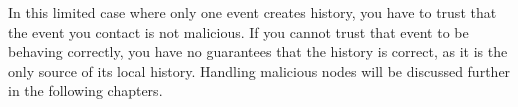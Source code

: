	\newpar In this limited case where only one event creates history, you have to trust that the event you contact is not malicious. If you cannot trust that event to be behaving correctly, you have no guarantees that the history is correct, as it is the only source of its local history. Handling malicious nodes will be discussed further in the following chapters.
